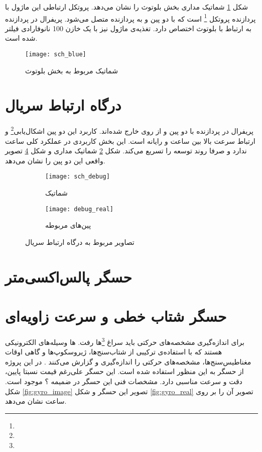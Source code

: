 شکل \ref{fig:sch-blue} شماتیک مداری بخش بلوتوث را نشان می‌دهد. پروتکل ارتباطی این ماژول با پردازنده پروتکل
 \footnote{}
است که با دو پین  و  به پردازنده متصل می‌شود. پریفرال  در پردازنده به ارتباط با بلوتوث اختصاص دارد. تغذیه‌ی ماژول نیز با یک خازن 100 نانوفارادی فیلتر شده است.

\begin{figure}[h]
	\centering
	\texttt{[image: sch\_blue]}
	\caption{شماتیک مربوط به بخش بلوتوث}
	\label{fig:sch-blue}
\end{figure}

\section{درگاه ارتباط سریال}
پریفرال  در پردازنده با دو پین  و  از روی \pcbf خارج شده‌اند. کاربرد این دو پین اشکال‌یابی\footnote{} و ارتباط سرعت بالا بین ساعت و رایانه است. این بخش کاربردی در عملکرد کلی ساعت ندارد و صرفا روند توسعه را تسریع می‌کند. شکل \ref{fig:sch_debug} شماتیک مداری و شکل \ref{fig:debug_real} تصویر واقعی این دو پین را نشان می‌دهد.

\begin{figure}[h]
	\centering
	\begin{subfigure}{0.59\textwidth}
		\centering
		\texttt{[image: sch\_debug]}
		\caption{شماتیک}
		\label{fig:sch_debug}
	\end{subfigure}
	\begin{subfigure}{0.4\textwidth}
		\centering
		\texttt{[image: debug\_real]}
		\caption{پین‌های مربوطه}
		\label{fig:debug_real}
	\end{subfigure}
	\caption{تصاویر مربوط به درگاه ارتباط سریال}
\end{figure}

\section{حسگر پالس‌اکسی‌متر}
\newpage

\section{حسگر شتاب خطی و سرعت زاویه‌ای}
برای اندازه‌گیری مشخصه‌های حرکتی باید سراغ
\footnote{}ها
رفت. ها وسیله‌های الکترونیکی هستند که با استفاده‌ی ترکیبی از شتاب‌سنج‌ها، ژیروسکوپ‌ها و گاهی اوقات مغناطیس‌سنج‌ها، مشخصه‌های حرکتی را اندازه‌گیری و گزارش می‌کنند \cite{IMU}. در این پروژه از حسگر  به این منظور استفاده شده است. این حسگر علی‌رغم قیمت نسبتا پایین، دقت و سرعت مناسبی دارد. مشخصات فنی این حسگر در ضمیمه ؟ موجود است. شکل \ref{fig:gyro_image} تصویر این حسگر و شکل \ref{fig:gyro_real} تصویر آن را بر روی \pcbf ساعت نشان می‌دهد.

